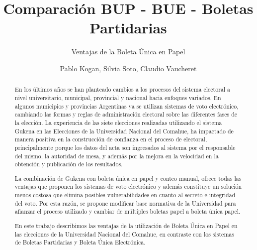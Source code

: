 \documentclass{llncs}
\begin{document}
%

%
\title{Comparación BUP - BUE - Boletas Partidarias}
\subtitle{Ventajas de la Boleta Única en Papel}
%



\author{ Pablo Kogan, Silvia Soto, Claudio Vaucheret }


\maketitle              %
%
\begin{abstract}
En los últimos años se han planteado cambios a los procesos del sistema electoral a nivel universitario, municipal, provincial y nacional hacia enfoques variados. 
En algunos municipios y provincias Argentinas ya se utilizan sistemas de voto electrónico, cambiando las formas y reglas de administración electoral sobre las diferentes fases de la elección.
La experiencia de las siete elecciones realizadas utilizando el sistema Gukena en las Elecciones de la Universidad Nacional del Comahue, ha impactado de manera positiva en la construcción de confianza en el proceso de electoral, principalmente porque los datos del acta son ingresados al sistema por el responsable del mismo, la autoridad de mesa, y además por la mejora en la velocidad en la obtención y publicación de los resultados.  

La combinación de Gukena con boleta única en papel y conteo manual, ofrece todas las ventajas que proponen los sistemas de voto electrónico y además constituye un solución menos costosa que elimina posibles vulnerabilidades en cuanto al secreto e integridad del voto.
Por esta razón, se propone modificar base normativa de la Universidad para afianzar el proceso utilizado y cambiar de múltiples boletas papel a boleta única papel.

En este trabajo describimos las ventajas de la utilización de Boleta Única en Papel en las elecciones de la Universidad Nacional del Comahue, en contraste con los sistemas de Boletas Partidarias y Boleta Única Electrónica.


\end{abstract}
%
\end{document}

